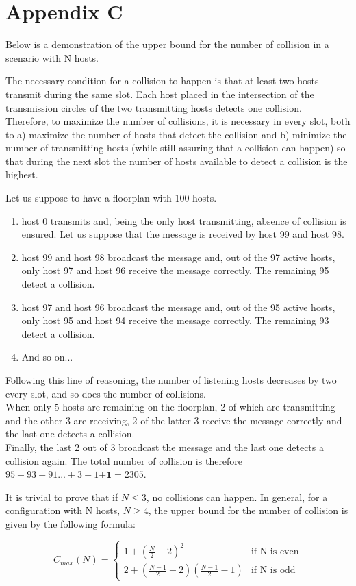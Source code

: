 \section*{Appendix C}
\label{app:c}
Below is a demonstration of the upper bound for the number of collision in a scenario with N hosts.

\hfill \break
The necessary condition for a collision to happen is that at least two hosts transmit during the same slot. Each host placed in the intersection of the transmission circles of the two transmitting hosts detects one collision. \\
Therefore, to maximize the number of collisions, it is necessary in every slot, both to a) maximize the number of hosts that detect the collision and b) minimize the number of transmitting hosts (while still assuring that a collision can happen) so that during the next slot the number of hosts available to detect a collision is the highest.

\hfill \break
Let us suppose to have a floorplan with 100 hosts.\\
\begin{enumerate}
	\item
	host 0 transmits and, being the only host transmitting, absence of collision is ensured. Let us suppose that the message is received by host 99 and host 98.
	\item
	host 99 and host 98 broadcast the message and, out of the 97 active hosts, only host 97 and host 96 receive the message correctly. The remaining 95 detect a collision.
	\item
	host 97 and host 96 broadcast the message and, out of the 95 active hosts, only host 95 and host 94 receive the message correctly. The remaining 93 detect a collision.
	\item
	And so on...

\end{enumerate}
\hfill \break
Following this line of reasoning, the number of listening hosts decreases by two every slot, and so does the number of collisions.\\
When only 5 hosts are remaining on the floorplan, 2 of which are transmitting and the other 3 are receiving, 2 of the latter 3 receive the message correctly and the last one detects a collision.\\
Finally, the last 2 out of 3 broadcast the message and the last one detects a collision again.
\hfill \break
The total number of collision is therefore $95+93+91...+3+1\textbf{+1} = 2305$.

\hfill \break
It is trivial to prove that if $N \leq 3$, no collisions can happen.
\hfill \break
In general, for a configuration with N hosts, $N \geq 4$, the upper bound for the number of collision is given by the following formula:

\begin{equation}
\label{eq:collisionUpperBound}
	C_{max}(N) = \begin{cases}
	1+(\frac{N}{2}-2)^2 &\text{if N is even}\\
	2+(\frac{N-1}{2} - 2)(\frac{N-1}{2}-1) &\text{if N is odd}
	\end{cases}
\end{equation}
